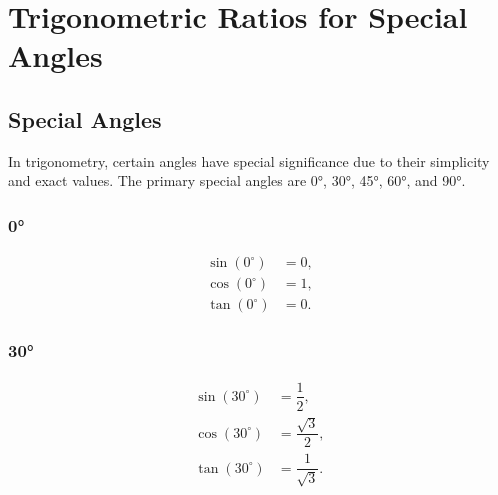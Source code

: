 \documentclass{article}
\begin{document}
\section{Trigonometric Ratios for Special Angles}

\subsection{Special Angles}
In trigonometry, certain angles have special significance due to their simplicity and exact values. The primary special angles are 0°, 30°, 45°, 60°, and 90°.

\subsubsection*{0°}
\begin{minipage}{0.5\textwidth}
\end{minipage}%
\begin{minipage}{0.5\textwidth}
\[
\begin{aligned}
\sin(0^\circ) &= 0, \\
\cos(0^\circ) &= 1, \\
\tan(0^\circ) &= 0.
\end{aligned}
\]
\end{minipage}

\subsubsection*{30°}
\begin{minipage}{0.5\textwidth}
\end{minipage}%
\begin{minipage}{0.5\textwidth}
\[
\begin{aligned}
\sin(30^\circ) &= \dfrac{1}{2}, \\
\cos(30^\circ) &= \dfrac{\sqrt{3}}{2}, \\
\tan(30^\circ) &= \dfrac{1}{\sqrt{3}}.
\end{aligned}
\]
\end{minipage}
\end{document}
